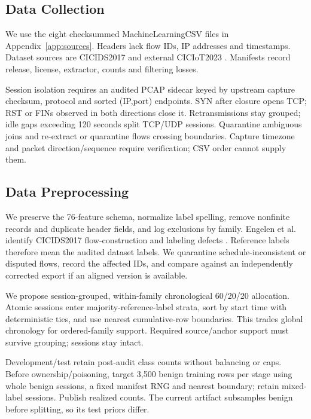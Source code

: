 \documentclass[10pt,a4paper]{article}
\begin{document}
\subsection{Data Collection}
We use the eight checksummed MachineLearningCSV files in Appendix~\ref{app:sources}. Headers lack flow IDs, IP addresses and timestamps. Dataset sources are CICIDS2017 \cite{dataset} and external CICIoT2023 \cite{iot}. Manifests record release, license, extractor, counts and filtering losses.

Session isolation requires an audited PCAP sidecar keyed by upstream capture checksum, protocol and sorted (IP,port) endpoints. SYN after closure opens TCP; RST or FINs observed in both directions close it. Retransmissions stay grouped; idle gaps exceeding 120 seconds split TCP/UDP sessions. Quarantine ambiguous joins and re-extract or quarantine flows crossing boundaries. Capture timezone and packet direction/sequence require verification; CSV order cannot supply them.

\subsection{Data Preprocessing}
We preserve the 76-feature schema, normalize label spelling, remove nonfinite records and duplicate header fields, and log exclusions by family. Engelen et al. identify CICIDS2017 flow-construction and labeling defects \cite{engelen}. Reference labels therefore mean the audited dataset labels. We quarantine schedule-inconsistent or disputed flows, record the affected IDs, and compare against an independently corrected export if an aligned version is available.

We propose session-grouped, within-family chronological 60/20/20 allocation. Atomic sessions enter majority-reference-label strata, sort by start time with deterministic ties, and use nearest cumulative-row boundaries. This trades global chronology for ordered-family support. Required source/anchor support must survive grouping; sessions stay intact.

Development/test retain post-audit class counts without balancing or caps. Before ownership/poisoning, target 3,500 benign training rows per stage using whole benign sessions, a fixed manifest RNG and nearest boundary; retain mixed-label sessions. Publish realized counts. The current artifact subsamples benign before splitting, so its test priors differ.
\end{document}
